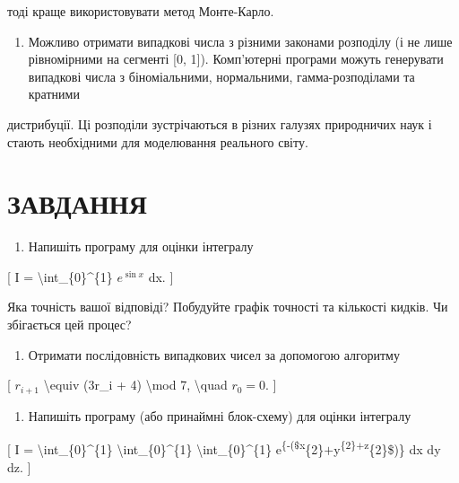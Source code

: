 \documentclass[
]{article}
\providecommand{\tightlist}{%
  \setlength{\itemsep}{0pt}\setlength{\parskip}{0pt}}
\begin{document}
{{{тоді краще використовувати метод Монте-Карло.

\begin{enumerate}
\def\labelenumi{\arabic{enumi}.}
\setcounter{enumi}{2}
\tightlist
\item
  Можливо отримати випадкові числа з різними законами розподілу (і не
  лише рівномірними на сегменті {[}0, 1{]}). Комп'ютерні програми можуть
  генерувати випадкові числа з біноміальними, нормальними,
  гамма-розподілами та кратними
\end{enumerate}

дистрибуції. Ці розподіли зустрічаються в різних галузях природничих
наук і стають необхідними для моделювання реального світу.

\section{ЗАВДАННЯ}\label{ux437ux430ux432ux434ux430ux43dux43dux44f-10}

\begin{enumerate}
\def\labelenumi{\arabic{enumi}.}
\tightlist
\item
  Напишіть програму для оцінки інтегралу
\end{enumerate}

{[} I = \textbackslash int\_\{0\}\^{}\{1\} \(e^{\sin x}\) dx. {]}

Яка точність вашої відповіді? Побудуйте графік точності та кількості
кидків. Чи збігається цей процес?

\begin{enumerate}
\def\labelenumi{\arabic{enumi}.}
\setcounter{enumi}{1}
\tightlist
\item
  Отримати послідовність випадкових чисел за допомогою алгоритму
\end{enumerate}

{[} \(r_{i+1}\) \textbackslash equiv (3r\_i + 4) \textbackslash mod 7,
\textbackslash quad \(r_0 = 0\). {]}

\begin{enumerate}
\def\labelenumi{\arabic{enumi}.}
\setcounter{enumi}{2}
\tightlist
\item
  Напишіть програму (або принаймні блок-схему) для оцінки інтегралу
\end{enumerate}

{[} I = \textbackslash int\_\{0\}\^{}\{1\}
\textbackslash int\_\{0\}\^{}\{1\} \textbackslash int\_\{0\}\^{}\{1\}
e\textsuperscript{\{-(\$x}\{2\}\(+\)y\textsuperscript{\{2\}\(+\)z}\{2\}\$)\}
dx dy dz. {]}

}}}
\end{document}
